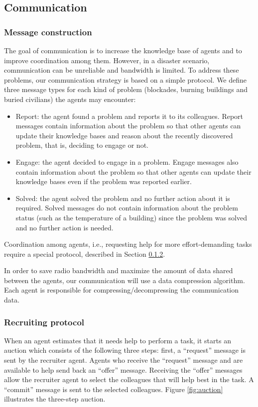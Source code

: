 \subsection{Communication}
\label{sec:communication}

\subsubsection{Message construction}
The goal of communication is to increase the knowledge base of agents and to improve coordination among them. However, in a disaster scenario, communication can be unreliable and bandwidth is limited. To address these problems, our communication strategy is based on a simple protocol. We define three message types for each kind of problem (blockades, burning buildings and buried civilians) the agents may encounter:

\begin{itemize}
 \item Report: the agent found a problem and reports it to its colleagues. Report messages contain information about the problem so that other agents can update their knowledge bases and reason about the recently discovered problem, that is, deciding to engage or not.

 \item Engage: the agent decided to engage in a problem. Engage messages also contain information about the problem so that other agents can update their knowledge bases even if the problem was reported earlier.

 \item Solved: the agent solved the problem and no further action about it is required. Solved messages do not contain information about the problem status (such as the temperature of a building) since the problem was solved and no further action is needed.
\end{itemize}

Coordination among agents, i.e., requesting help for more effort-demanding tasks require a special protocol, described in Section \ref{sec:recruiting}.

In order to save radio bandwidth and maximize the amount of data shared between the agents, our communication will use a data compression algorithm. Each agent is responsible for compressing/decompressing the communication data.

\subsubsection{Recruiting protocol}
\label{sec:recruiting}
When an agent estimates that it needs help to perform a task, it starts an auction which consists of the following three steps: first, a ``request'' message is sent by the recruiter agent. Agents who receive the ``request'' message and are available to help  send back an ``offer'' message. Receiving the ``offer'' messages allow the recruiter agent to select the colleagues that will help best in the task. A ``commit'' message is sent to the selected colleagues. Figure \ref{fig:auction} illustrates the three-step auction.

